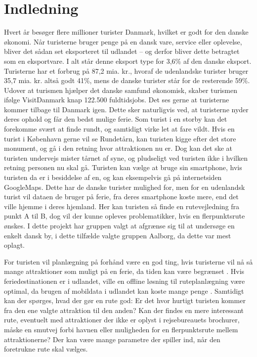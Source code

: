 \chapter{Indledning}

Hvert år besøger flere millioner turister Danmark, hvilket er godt for den danske økonomi. Når turisterne bruger penge på en dansk vare, service eller oplevelse, bliver det sådan set eksporteret til udlandet – og derfor bliver dette betragtet som en eksportvare. I alt står denne eksport type for 3,6\% af den danske eksport. Turisterne har et forbrug på 87,2 mia. kr., hvoraf de udenlandske turister bruger 35,7 mia. kr. altså godt 41\%, mens de danske turister står for de resterende 59\%. Udover at turismen hjælper det danske samfund økonomisk, skaber turismen ifølge VisitDanmark knap 122.500 fuldtidsjobs. \citep{faktaogtalVD}  \newline
Det ses gerne at turisterne kommer tilbage til Danmark igen. Dette sker naturligvis ved, at turisterne nyder deres ophold og får den bedst mulige ferie. Som turist i en storby kan det forekomme svært at finde rundt, og samtidigt virke let at fare vildt. Hvis en turist i København gerne vil se Rundetårn, kan turisten kigge efter det store monument, og gå i den retning hvor attraktionen nu er. Dog kan det ske at turisten undervejs mister tårnet af syne, og pludseligt ved turisten ikke i hvilken retning personen nu skal gå. Turisten kan vælge at bruge sin smartphone, hvis turisten da er i besiddelse af en, og kan eksempelvis gå på internetsiden GoogleMaps. Dette har de danske turister mulighed for, men for en udenlandsk turist vil dataen de bruger på ferie, fra deres smartphone koste mere, end det ville hjemme i deres hjemland\citep{VF}.  Her kan turisten så finde en rutevejledning fra punkt A til B, dog vil der kunne opleves problematikker, hvis en flerpunktsrute ønskes. I dette projekt har gruppen valgt at afgrænse sig til at undersøge en enkelt dansk by, i dette tilfælde valgte gruppen Aalborg, da dette var mest oplagt.

For turisten vil planlægning på forhånd være en god ting, hvis turisterne vil nå så mange attraktioner som muligt på en ferie, da tiden kan være begrænset \citep{YouthCentral}. Hvis feriedestinationen er i udlandet, ville en offline løsning til ruteplanlægning være optimal, da brugen af mobildata i udlandet kan koste mange penge \citep {TDC}.\newline
Samtidigt kan der spørges, hvad der gør en rute god: Er det hvor hurtigt turisten kommer fra den ene valgte attraktion til den anden? Kan der findes en mere interessant rute, eventuelt med attraktioner der ikke er oplyst i rejsebureauets brochurer, måske en smutvej forbi havnen eller muligheden for en flerpunktsrute mellem attraktionerne? Der kan være mange parametre der spiller ind, når den foretrukne rute skal vælges.

